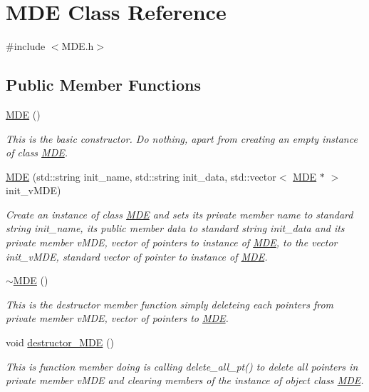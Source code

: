 \hypertarget{classMDE}{}\section{M\+DE Class Reference}
\label{classMDE}


{\ttfamily \#include $<$M\+D\+E.\+h$>$}

\subsection*{Public Member Functions}
\begin{DoxyCompactItemize}
\item 
\hyperlink{classMDE_a149c182b2578cc172f7bb1fc6f228a70}{M\+DE} ()
\begin{DoxyCompactList}\small\item\em This is the basic constructor. Do nothing, apart from creating an empty instance of class \hyperlink{classMDE}{M\+DE}. \end{DoxyCompactList}\item 
\hyperlink{classMDE_ab89dcf89d8714959c36ebb32bcf6280a}{M\+DE} (std\+::string init\+\_\+name, std\+::string init\+\_\+data, std\+::vector$<$ \hyperlink{classMDE}{M\+DE} $\ast$ $>$ init\+\_\+v\+M\+DE)
\begin{DoxyCompactList}\small\item\em Create an instance of class \hyperlink{classMDE}{M\+DE} and sets its private member \textquotesingle{}name\textquotesingle{} to standard string init\+\_\+name, its public member \textquotesingle{}data\textquotesingle{} to standard string init\+\_\+data and its private member v\+M\+DE, vector of pointers to instance of \hyperlink{classMDE}{M\+DE}, to the vector init\+\_\+v\+M\+DE, standard vector of pointer to instance of \hyperlink{classMDE}{M\+DE}. \end{DoxyCompactList}\item 
\hyperlink{group__group__clear_ga659629fc7fa0747f1853f23d107bb67a}{$\sim$\+M\+DE} ()
\begin{DoxyCompactList}\small\item\em This is the destructor member function simply deleteing each pointers from private member v\+M\+DE, vector of pointers to \hyperlink{classMDE}{M\+DE}. \end{DoxyCompactList}\item 
void \hyperlink{group__group__clear_gad832700663a9577adea73d14aee5011f}{destructor\+\_\+\+M\+DE} ()
\begin{DoxyCompactList}\small\item\em This is function member doing is calling delete\+\_\+all\+\_\+pt() to delete all pointers in private member v\+M\+DE and clearing members of the instance of object class \hyperlink{classMDE}{M\+DE}. \end{DoxyCompactList}\item 

\end{DoxyCompactItemize}
